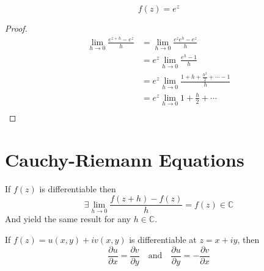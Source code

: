 \begin{example}
    $$f(z) = e^z$$
\end{example}

\begin{proof}
    \begin{align*}
        \lim_{h \to 0} \frac{e^{z + h} - e^z}{h} & = \lim_{h \to 0} \frac{e^z e^h - e^z}{h}                          \\
                                                 & = e^z \lim_{h \to 0} \frac{e^h - 1}{h}                            \\
                                                 & = e^z \lim_{h \to 0} \frac{1 + h + \frac{h^2}{2} + \cdots - 1}{h} \\
                                                 & = e^z \lim_{h \to 0} 1 + \frac{h}{2} + \cdots                     \\
    \end{align*}
\end{proof}

\section{Cauchy-Riemann Equations}
\begin{lemma}
    If $f(z)$ is differentiable then $$\exists\lim_{h \to 0} \frac{f(z + h) - f(z)}{h} = f(z) \in \mathbb{C}$$
    And yield the same result for any $h \in \mathbb{C}$.
\end{lemma}


\begin{theorem}
    If $f(z) = u(x,y) + iv(x,y)$ is differentiable at $z = x + iy$, then
    $$\frac{\partial u}{\partial x} = \frac{\partial v}{\partial y} \quad \text{and} \quad \frac{\partial u}{\partial y} = -\frac{\partial v}{\partial x}$$
\end{theorem}


